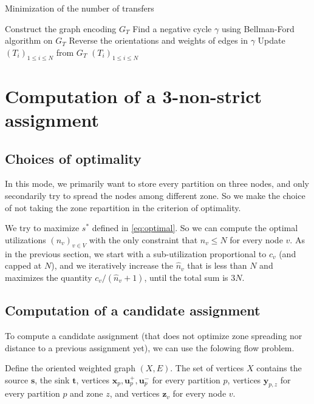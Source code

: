 \documentclass[]{article}
\begin{document}
\begin{algorithm}
	\caption{Minimization of the number of transfers}
	\label{alg:mini}
	\begin{algorithmic}[1]
		\State Construct the graph encoding $G_T$
		\Repeat \label{lin:repeat}
		\State Find a negative cycle $\gamma$ using Bellman-Ford algorithm on $G_T$
		\State Reverse the orientations and weights of edges in $\gamma$
		\State Update $(T_i)_{1\le i\le N}$ from $G_T$
		\State \Return $(T_i)_{1\le i\le N}$
		\EndFunction
	\end{algorithmic}
\end{algorithm}

\newpage

\section{Computation of a 3-non-strict assignment}

\subsection{Choices of optimality}

In this mode, we primarily want to store every partition on three nodes, and only secondarily try to spread the nodes among different zone. So we make the choice of not taking the zone repartition in the criterion of optimality.

We try to maximize $s^*$ defined in \eqref{eq:optimal}. So we can compute the optimal utilizations $(n_v)_{v\in V}$ with the only constraint that $n_v \le N$ for every node $v$. As in the previous section, we start with a sub-utilization proportional to $c_v$ (and capped at $N$), and we iteratively increase the $\hat{n}_v$ that is less than $N$ and maximizes the quantity $c_v/(\hat{n}_v+1)$, until the total sum is $3N$.

\subsection{Computation of a candidate assignment}

To compute a candidate assignment (that does not optimize zone spreading nor distance to a previous assignment yet), we can use the folowing flow problem.

Define the oriented weighted graph $(X,E)$. The set of vertices $X$ contains the source $\mathbf{s}$, the sink $\mathbf{t}$, vertices 
$\mathbf{x}_p, \mathbf{u}^+_p, \mathbf{u}^-_p$ for every partition $p$, vertices $\mathbf{y}_{p,z}$ for every partition $p$ and zone $z$, and vertices $\mathbf{z}_v$ for every node $v$. 
\end{document}
